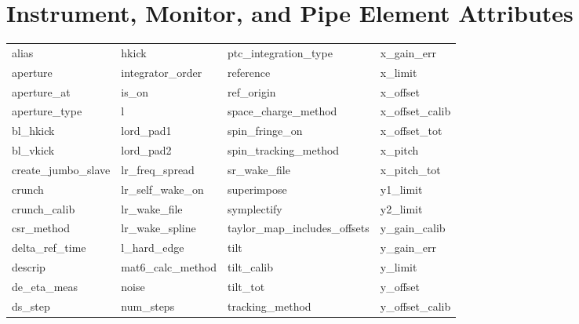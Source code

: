  \section{Instrument, Monitor, and Pipe Element Attributes}
 \label{s:list.instrument}
 
 \begin{tabular}{llll} \toprule
alias                       & hkick                       & ptc_integration_type        & x_gain_err                  \\
aperture                    & integrator_order            & reference                   & x_limit                     \\
aperture_at                 & is_on                       & ref_origin                  & x_offset                    \\
aperture_type               & l                           & space_charge_method         & x_offset_calib              \\
bl_hkick                    & lord_pad1                   & spin_fringe_on              & x_offset_tot                \\
bl_vkick                    & lord_pad2                   & spin_tracking_method        & x_pitch                     \\
create_jumbo_slave          & lr_freq_spread              & sr_wake_file                & x_pitch_tot                 \\
crunch                      & lr_self_wake_on             & superimpose                 & y1_limit                    \\
crunch_calib                & lr_wake_file                & symplectify                 & y2_limit                    \\
csr_method                  & lr_wake_spline              & taylor_map_includes_offsets & y_gain_calib                \\
delta_ref_time              & l_hard_edge                 & tilt                        & y_gain_err                  \\
descrip                     & mat6_calc_method            & tilt_calib                  & y_limit                     \\
de_eta_meas                 & noise                       & tilt_tot                    & y_offset                    \\
ds_step                     & num_steps                   & tracking_method             & y_offset_calib              \\

\end{tabular}
